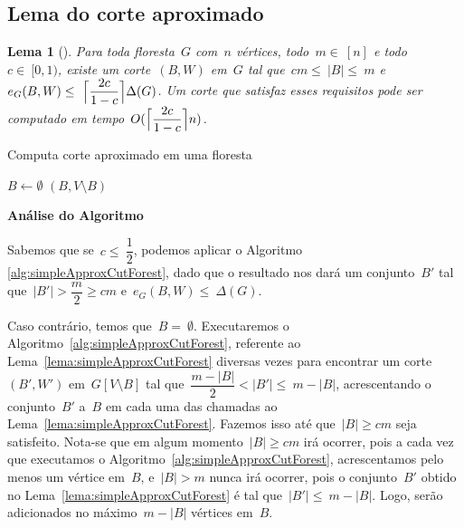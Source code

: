 \documentclass[a4paper,12pt]{article}
\DeclarePairedDelimiter\ceil{\lceil}{\rceil}
\newtheorem{lem}{Lema}
\begin{document}
\subsection{Lema do corte aproximado}

\begin{lem}[{\cite[Lemma 3]{Schmidt15}}]
\label{lema:approxCutForest}
	Para toda floresta~$G$ com~$n$ vértices, todo~$m \in~[n]$
	e todo~$c \in~[0,1)$,
	existe um corte~$(B,W)$ em~$G$ tal 
	que~$cm \le~|B| \le~m$ 
	e~$e_G(B,W) \le~\ceil[\Big]{ \dfrac{2c}{1-c}} \Delta(G)$.
	Um corte que satisfaz esses requisitos pode ser computado em
	tempo~$O(\ceil[\Big]{ \dfrac{2c}{1-c}} n)$.
\end{lem}

\medskip
\medskip

\begin{algorithm}[H]
\label{alg:approxCutForest}

	\caption{Computa corte aproximado em uma floresta}
	{
		$B \gets \emptyset$\;
	}
	\Return $(B,V\setminus B)$

\end{algorithm}	

\bigskip
\bigskip
\bigskip

\textbf{Análise do Algoritmo}

	Sabemos que se~$c \le~\dfrac{1}{2}$, podemos aplicar o Algoritmo 
	\ref{alg:simpleApproxCutForest}, 
	dado que o resultado nos dará um conjunto~$B'$ tal 
	que~$|B'|>\dfrac{m}{2}\ge cm$ e~$e_G(B,W)\le~\Delta(G)$.

	Caso contrário, temos que~$B =~\emptyset$.
	Executaremos o 
	Algoritmo~\ref{alg:simpleApproxCutForest}, referente ao 
	Lema~\ref{lema:simpleApproxCutForest}
	diversas vezes para 
	encontrar 
	um corte~$(B',W')$ em~$G[V\setminus B]$ tal 
	que~$\dfrac{m-|B|}{2}<|B'|\le~m-|B|$,
	acrescentando o conjunto~$B'$ a~$B$ em cada uma das chamadas ao 
	Lema~\ref{lema:simpleApproxCutForest}.
	Fazemos isso até que~$|B|\ge cm$ seja satisfeito.
	Nota-se que em algum momento~$|B|\ge cm$ irá ocorrer, pois a cada vez
	que executamos o 
	Algoritmo~\ref{alg:simpleApproxCutForest}, 
	acrescentamos pelo menos um vértice em~$B$,
	e~$|B|>m$ nunca irá ocorrer, pois o conjunto~$B'$ obtido no 
	Lema~\ref{lema:simpleApproxCutForest} é
	tal que~$|B'|\le~m-|B|$. Logo, serão adicionados no 
	máximo~$m-|B|$ vértices em~$B$.
\end{document}
